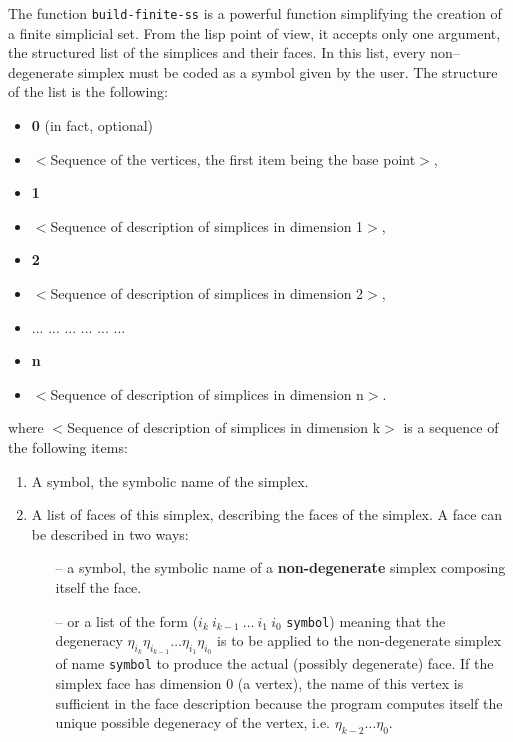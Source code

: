The function {\tt build-finite-ss}
is a powerful function simplifying the creation of a finite
simplicial set. From the lisp point of view, it accepts only one argument, the structured list
of the simplices and their faces. In this list, every non--degenerate simplex must
be coded as a symbol given by the user.  The  structure of the list is the following:
\begin{itemize}
\item {\bf 0}    (in fact, optional)
\item $<$Sequence of the vertices, the first item being the base point$>$,
\item {\bf 1}
\item $<$Sequence of description of simplices in dimension 1$>$,
\item {\bf 2}
\item $<$Sequence of description of simplices in dimension 2$>$,
\item   ... ... ... ... ... ...
\item {\bf n}
\item $<$Sequence of description of simplices in dimension n$>$.
\end{itemize}
where $<$Sequence of description of simplices in dimension k$>$ is a sequence of
the following items:
\begin{enumerate}
\item A symbol, the symbolic name of the simplex.
\item A list of  faces of this simplex, describing the faces of the simplex.
A face can be described in two ways:
\begin{itemize}
\item [--] a symbol, the symbolic name of a {\bf non-degenerate} simplex composing itself the
face.
\item [--] or a list of the form  ($i_k\ i_{k-1}\ \ldots \ i_1 \ i_0$ {\tt symbol}) meaning that the degeneracy
$\eta_{i_k}\eta_{i_{k-1}}\ldots\eta_{i_1}\eta_{i_0}$ is to be applied to the non-degenerate simplex
of name {\tt symbol}  to produce the actual (possibly degenerate) face. If the simplex face has dimension $0$ (a vertex),
the name of this vertex is sufficient in the
face description because the program computes itself
the unique possible degeneracy of the vertex, i.e. $\eta_{k-2}\ldots\eta_0$.
\end{itemize}

\end{enumerate}
